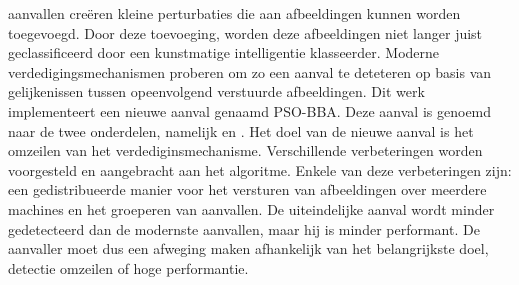 \begin{abstract*}
 aanvallen creëren kleine perturbaties die aan afbeeldingen kunnen worden toegevoegd. Door deze toevoeging, worden deze afbeeldingen niet langer juist geclassificeerd door een kunstmatige intelligentie klasseerder. Moderne verdedigingsmechanismen proberen om zo een aanval te deteteren op basis van gelijkenissen tussen opeenvolgend verstuurde afbeeldingen. Dit werk implementeert een nieuwe  aanval genaamd PSO-BBA. Deze aanval is genoemd naar de twee onderdelen, namelijk  en  \cite{brunner_guessing_2019}. Het doel van de nieuwe aanval is het omzeilen van het verdediginsmechanisme. Verschillende verbeteringen worden voorgesteld en aangebracht aan het algoritme. Enkele van deze verbeteringen zijn: een gedistribueerde manier voor het versturen van afbeeldingen over meerdere machines en het groeperen van aanvallen. De uiteindelijke aanval wordt minder gedetecteerd dan de modernste aanvallen, maar hij is minder performant. De aanvaller moet dus een afweging maken afhankelijk van het belangrijkste doel, detectie omzeilen of hoge performantie.
\end{abstract*}
